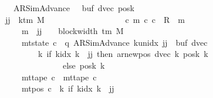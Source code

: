 \begin{isabellebody}
\ \ \ \ \ \ \ \ \ \ \ \ \ \ \ \ \ \ \ {\isacharparenleft}{\kern0pt}AR{\isacharunderscore}{\kern0pt}SimAdvance{\isacharcomma}{\kern0pt}\ {}{\isacharcomma}{\kern0pt}\ {}{\isacharcomma}{\kern0pt}\ buf{}{\isacharcomma}{\kern0pt}\ dvec{\isacharcomma}{\kern0pt}\ posk{}{\isacharparenright}{\kern0pt}{\isacharsemicolon}{\kern0pt}\isanewline
\ \ \ \ \ \ \ \ \ \ \ \ \ \ \ \ \ jj\ {\isasymle}\ k{\isacharunderscore}{\kern0pt}tm\ M\ {\isacharminus}{\kern0pt}\ {}\ {\isasymrbrakk}\isanewline
\ \ \ \ \ \ \ \ \ \ \ \ \ \ \ {\isasymLongrightarrow}\ {\isacharparenleft}{\kern0pt}{\isasymexists}c\ m{\isachardot}{\kern0pt}\ {\isacharparenleft}{\kern0pt}c{}{\isacharcomma}{\kern0pt}\ c{\isacharparenright}{\kern0pt}\ {\isasymin}\ R{\isacharprime}{\kern0pt}\ {\isacharcircum}{\kern0pt}{\isacharcircum}{\kern0pt}\ m\isanewline
\ \ \ \ \ \ \ \ \ \ \ \ \ \ \ \ \ \ \ \ {\isasymand}\ m\ {\isasymle}\ jj\ {\isacharasterisk}{\kern0pt}\ {\isacharparenleft}{\kern0pt}{}\ {\isacharasterisk}{\kern0pt}\ block{\isacharunderscore}{\kern0pt}width\ {\isacharparenleft}{\kern0pt}{\isasymGamma}{\isacharunderscore}{\kern0pt}tm\ M{\isacharparenright}{\kern0pt}{\isacharparenright}{\kern0pt}\isanewline
\ \ \ \ \ \ \ \ \ \ \ \ \ \ \ \ \ \ \ \ {\isasymand}\ mt{\isacharunderscore}{\kern0pt}state\ c\ {\isacharequal}{\kern0pt}\ {\isacharparenleft}{\kern0pt}q{\isacharcomma}{\kern0pt}\ AR{\isacharunderscore}{\kern0pt}SimAdvance{\isacharcomma}{\kern0pt}\ k{\isacharunderscore}{\kern0pt}unidx\ jj{\isacharcomma}{\kern0pt}\ {}{\isacharcomma}{\kern0pt}\ buf{}{\isacharcomma}{\kern0pt}\ dvec{\isacharcomma}{\kern0pt}\isanewline
\ \ \ \ \ \ \ \ \ \ \ \ \ \ \ \ \ \ \ \ \ \ \ \ \ {\isacharparenleft}{\kern0pt}{\isasymlambda}k{\isachardot}{\kern0pt}\ if\ k{\isacharunderscore}{\kern0pt}idx\ k\ {\isacharless}{\kern0pt}\ jj\ then\ ar{\isacharunderscore}{\kern0pt}newpos\ {\isacharparenleft}{\kern0pt}dvec\ k{\isacharparenright}{\kern0pt}\ {\isacharparenleft}{\kern0pt}posk{}\ k{\isacharparenright}{\kern0pt}\isanewline
\ \ \ \ \ \ \ \ \ \ \ \ \ \ \ \ \ \ \ \ \ \ \ \ \ \ \ \ \ \ \ else\ posk{}\ k{\isacharparenright}{\kern0pt}{\isacharparenright}{\kern0pt}\isanewline
\ \ \ \ \ \ \ \ \ \ \ \ \ \ \ \ \ \ \ \ {\isasymand}\ mt{\isacharunderscore}{\kern0pt}tape\ c\ {\isacharequal}{\kern0pt}\ mt{\isacharunderscore}{\kern0pt}tape\ c{}\isanewline
\ \ \ \ \ \ \ \ \ \ \ \ \ \ \ \ \ \ \ \ {\isasymand}\ mt{\isacharunderscore}{\kern0pt}pos\ c\ {\isacharequal}{\kern0pt}\ {\isacharparenleft}{\kern0pt}{\isasymlambda}k{\isachardot}{\kern0pt}\ if\ k{\isacharunderscore}{\kern0pt}idx\ k\ {\isacharless}{\kern0pt}\ jj\isanewline

\end{isabellebody}
